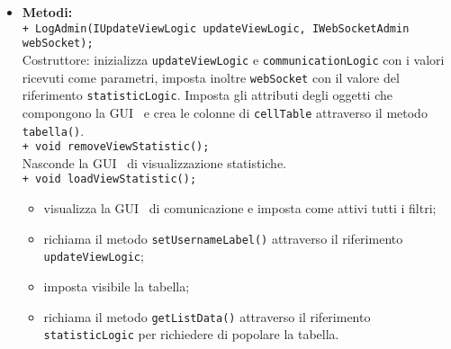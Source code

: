 {\begin{sloppypar}
{\begin{itemize}
\begin{itemize}
					\texttt[] \textbf{@UiField PushButton Aggiorna}: bottone per inviare la richiesta di aggiornamento di \texttt{cellTable} e impostare invisibili \texttt{ListBoxUtenti}, \texttt{BoxRicerca} e \texttt{ButtonRicercaInvio};\\
					\texttt[] \textbf{@UiField PushButton ButtonRicercaInvio}: bottone per richiedere di filtrare i dati di \texttt{cellTable} a seconda del tipo di filtro e della chiave inserita in \texttt{BoxRicerca} o \texttt{ListBoxUtenti};\\
					\texttt[] \textbf{@UiField InlineLabel LabelErrorRicerca}: label che contiene l’errore relativo alla ricerca della chiave usata da \texttt{filtro};\\
					\texttt[] \textbf{@UiField ListBox ListBoxUtenti}: oggetto contenente la lista di tutti gli utenti registrati;\\
					\texttt[] \textbf{@UiField TextBox BoxRicerca}: campo per l’inserimento della chiave da usare come filtro;\\
				
				\item[] \textbf{Metodi:}\\
					\texttt{+ LogAdmin(IUpdateViewLogic updateViewLogic, IWebSocketAdmin webSocket);}\\
					Costruttore: inizializza \texttt{updateViewLogic} e \texttt{communicationLogic} con i valori ricevuti come parametri, imposta inoltre \texttt{webSocket} con il valore del riferimento \texttt{statisticLogic}. Imposta gli attributi degli oggetti che compongono la GUI\g~ e crea le colonne di \texttt{cellTable} attraverso il metodo \texttt{tabella()}.\\

					\texttt{+ void removeViewStatistic();}\\
					Nasconde la GUI\g~ di visualizzazione statistiche.\\
					
					\texttt{+ void loadViewStatistic();}\\
					\begin{itemize}
						\item visualizza la GUI\g~ di comunicazione e imposta come attivi tutti i filtri;
						\item richiama il metodo \texttt{setUsernameLabel()} attraverso il riferimento \texttt{updateViewLogic};
						\item imposta visibile la tabella;
						\item richiama il metodo \texttt{getListData()} attraverso il riferimento \texttt{statisticLogic} per richiedere di popolare la tabella.
					\end{itemize}
					

\end{itemize}
\end{itemize}}
\end{sloppypar}}
